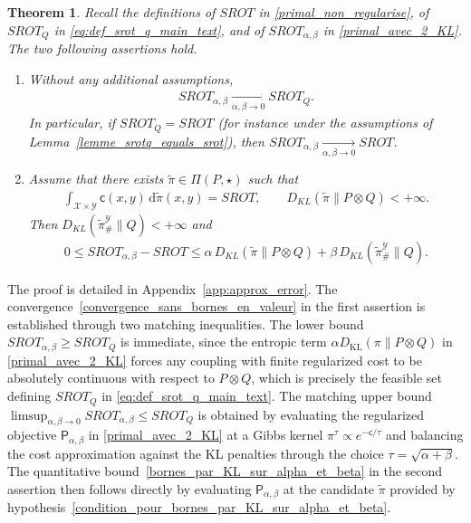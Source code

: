 \documentclass{article}
\newtheorem{theorem}{Theorem}[section]
\begin{document}
\begin{theorem}
  \label{theoreme_value_convergence_all_limits}
  Recall the definitions of $SROT$ in \eqref{primal_non_regularise}, of $SROT_Q$ in \eqref{eq:def_srot_q_main_text}, and of $SROT_{\alpha,\beta}$ in \eqref{primal_avec_2_KL}. The two following assertions hold.
  \begin{enumerate}
    \item Without any additional assumptions,
    \begin{align}
      \label{convergence_sans_bornes_en_valeur}
      SROT_{\alpha,\beta}
      \xrightarrow[\alpha,\beta\to 0]{}
      SROT_Q.
    \end{align}
    In particular, if $SROT_Q = SROT$ (for instance under the assumptions of
    Lemma~\ref{lemme_srotq_equals_srot}), then $SROT_{\alpha,\beta}
    \xrightarrow[\alpha,\beta\to 0]{} SROT$.

    \item Assume that there exists $\tilde\pi \in \Pi(P,\star)$ such that
    \begin{align}
      \label{condition_pour_bornes_par_KL_sur_alpha_et_beta}
      \int_{\mathcal{X}\times\mathcal{Y}}
        \mathsf{c}(x,y)\,\mathrm{d}\tilde\pi(x,y) = SROT,
      \qquad
      D_{KL}(\tilde\pi \| P\otimes Q) < +\infty.
    \end{align}
    Then $D_{KL}(\tilde\pi_{\#}^{\mathcal{Y}} \| Q) < +\infty$ and
    \begin{align}
      \label{bornes_par_KL_sur_alpha_et_beta}
      0
      \leq
      SROT_{\alpha,\beta} - SROT
      \leq
      \alpha \, D_{KL}(\tilde\pi \| P\otimes Q)
      +
      \beta \, D_{KL}(\tilde\pi_{\#}^{\mathcal{Y}} \| Q).
    \end{align}
  \end{enumerate}
\end{theorem}
The proof is detailed in Appendix~\ref{app:approx_error}. The convergence~\eqref{convergence_sans_bornes_en_valeur} in the first assertion is established through two matching inequalities. The lower bound $SROT_{\alpha,\beta} \geq SROT_Q$ is immediate, since the entropic term $\alpha D_{\mathrm{KL}}(\pi \| P\otimes Q)$ in \eqref{primal_avec_2_KL} forces any coupling with finite regularized cost to be absolutely continuous with respect to $P\otimes Q$, which is precisely the feasible set defining $SROT_Q$ in \eqref{eq:def_srot_q_main_text}. The matching upper bound $\limsup_{\alpha,\beta\to 0} SROT_{\alpha,\beta} \leq SROT_Q$ is obtained by evaluating the regularized objective $\mathsf{P}_{\alpha,\beta}$ in \eqref{primal_avec_2_KL} at a Gibbs kernel $\pi^\tau \propto e^{-\mathsf{c}/\tau}$ and balancing the cost approximation against the KL penalties through the choice $\tau = \sqrt{\alpha+\beta}$. The quantitative bound~\eqref{bornes_par_KL_sur_alpha_et_beta} in the second assertion then follows directly by evaluating $\mathsf{P}_{\alpha,\beta}$ at the candidate $\tilde\pi$ provided by hypothesis~\eqref{condition_pour_bornes_par_KL_sur_alpha_et_beta}.
\end{document}
